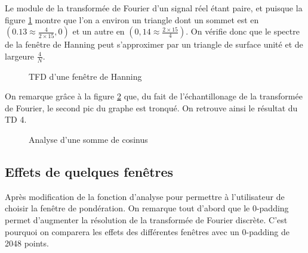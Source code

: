 \documentclass[french]{article}
\begin{document}
Le module de la transformée de Fourier d'un signal réel étant paire, et puisque la figure \ref{fig:hanning} montre que l'on a environ un triangle dont un sommet est en $(0.13 \approx \frac{4}{2\times15},0)$ et un autre en $(0,14\approx \frac{ 2 \times 15}{4})$. On vérifie donc que le spectre de la fenêtre de Hanning peut s'approximer par un triangle de surface unité et de largeure $\frac{4}{N}$.
  
\begin{figure}[h!]
	\centering
	
	\caption{TFD d'une fenêtre de Hanning}
	\label{fig:hanning}
\end{figure}

On remarque grâce à la figure \ref{fig:hanning_sans_0p} que, du fait de l'échantillonage de la transformée de Fourier, le second pic du graphe est tronqué. On retrouve ainsi le résultat du TD 4.

\begin{figure}[h!]
	\centering
	
	\caption{Analyse d'une somme de cosinus}
	\label{fig:hanning_sans_0p}
\end{figure}

\subsection{Effets de quelques fenêtres}

Après modification de la fonction d'analyse pour permettre à l'utilisateur de choisir la fenêtre de pondération. On remarque tout d'abord que le 0-padding permet d'augmenter la résolution de la transformée de Fourier discrète. C'est pourquoi on comparera les effets des différentes fenêtres avec un 0-padding de 2048 points.
\end{document}
